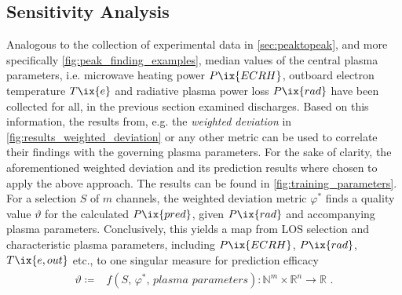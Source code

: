         \subsection{Sensitivity Analysis}\label{sec:senseresults}%
%
            Analogous to the collection of experimental data in \cref{sec:peaktopeak}, and more specifically \cref{fig:peak_finding_examples}, median values of the central plasma parameters, i.e. microwave heating power $P\ix{ECRH}$, outboard electron temperature $T\ix{e}$ and radiative plasma power loss $P\ix{rad}$ have been collected for all, in the previous section examined discharges. Based on this information, the results from, e.g. the \textit{weighted deviation} in \cref{fig:results_weighted_deviation} or any other metric can be used to correlate their findings with the governing plasma parameters. For the sake of clarity, the aforementioned weighted deviation and its prediction results where chosen to apply the above approach. The results can be found in \cref{fig:training_parameters}. For a selection $S$ of $m$ channels, the weighted deviation metric $\varphi^{\ast}$ finds a quality value $\vartheta$ for the calculated $P\ix{pred}$, given $P\ix{rad}$ and accompanying plasma parameters. Conclusively, this yields a map from LOS selection and characteristic plasma parameters, including $P\ix{ECRH}$, $P\ix{rad}$, $T\ix{e,out}$ etc., to one singular measure for prediction efficacy%
%
            \begin{align}%
                \begin{split}\label{eq:sensitivity_parameter_map}%
                    \vartheta\coloneqq &f\left(S,\,\varphi^{\ast},\,\textit{plasma parameters}\right)\colon\mathbb{N}^{m}\times\mathbb{R}^{n}\to\mathbb{R}\,\,.%
                \end{split}%
            \end{align}%
%
